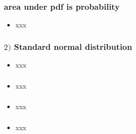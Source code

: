 \documentclass[english,14pt]{beamer}
\begin{document}

\begin{frame}[fragile]

\frametitle{area under pdf is probability}

\begin{itemize}
	\item xxx
\end{itemize}

\end{frame}


\begin{frame}[fragile]

\frametitle{$2)$ Standard normal distribution}

\begin{itemize}
	\item xxx
\end{itemize}

\end{frame}


\begin{frame}[fragile]

\frametitle{}

\begin{itemize}
	\item xxx
\end{itemize}

\end{frame}


\begin{frame}[fragile]

\frametitle{}

\begin{itemize}
	\item xxx
\end{itemize}

\end{frame}


\begin{frame}[fragile]

\frametitle{}

\begin{itemize}
	\item xxx
\end{itemize}

\end{frame}
\end{document}
